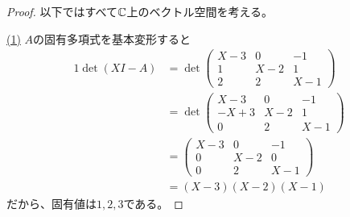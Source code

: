 \documentclass[report]{jlreq}
\begin{document}
\begin{proof}
    以下ではすべて$\mathbb{C}$上のベクトル空間を考える。

    \uline{(1)} \quad
    $A$の固有多項式を基本変形すると
    \begin{alignat}{1}
        \det(XI - A)
            &= \det \begin{pmatrix}
                X - 3 & 0 & -1 \\
                1 & X - 2 & 1 \\
                2 & 2 & X - 1
            \end{pmatrix} \\
            &= \det \begin{pmatrix}
                X - 3 & 0 & -1 \\
                -X + 3 & X - 2 & 1 \\
                0 & 2 & X - 1
            \end{pmatrix} \\
            &= \begin{pmatrix}
                X - 3 & 0 & -1 \\
                0 & X - 2 & 0 \\
                0 & 2 & X - 1
            \end{pmatrix} \\
            &= (X - 3)(X - 2)(X - 1)
    \end{alignat}
    だから、固有値は$1, 2, 3$である。


\end{proof}
\end{document}
